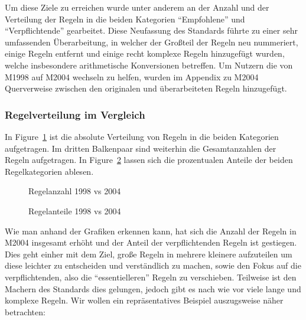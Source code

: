 \documentclass[a4paper,UKenglish,cleveref, autoref]{templates/lipics-v2019}
\begin{document}
    Um diese Ziele zu erreichen wurde unter anderem an der Anzahl und der Verteilung der Regeln in die beiden Kategorien
    \enquote{Empfohlene} und \enquote{Verpflichtende} gearbeitet.
    Diese Neufassung des Standards führte zu einer sehr umfassenden Überarbeitung, in welcher der Großteil der Regeln
    neu nummeriert, einige Regeln entfernt und einige recht komplexe Regeln hinzugefügt wurden, welche insbesondere
    arithmetische Konversionen betreffen.
    Um Nutzern die von M1998 auf M2004 wechseln zu helfen, wurden im Appendix zu M2004 Querverweise zwischen den originalen
    und überarbeiteten Regeln hinzugefügt.

    \subsubsection{Regelverteilung im Vergleich}

    In Figure~\ref{fig:bar-1998-2004} ist die absolute Verteilung von Regeln in die beiden Kategorien aufgetragen.
    Im dritten Balkenpaar sind weiterhin die Gesamtanzahlen der Regeln aufgetragen.
    In Figure~\ref{fig:pie-1998-2004} lassen sich die prozentualen Anteile der beiden Regelkategorien ablesen.

    \begin{figure}[H]
        \centering
        \captionsetup{justification=centering,margin=2cm}
        
        \caption{Regelanzahl 1998 vs 2004}
        \label{fig:bar-1998-2004}
    \end{figure}

    \begin{figure}[H]
        \centering
        \captionsetup{justification=centering,margin=2cm}
        
        \caption{Regelanteile 1998 vs 2004}
        \label{fig:pie-1998-2004}
    \end{figure}

    Wie man anhand der Grafiken erkennen kann, hat sich die Anzahl der Regeln in M2004 insgesamt erhöht und der Anteil
    der verpflichtenden Regeln ist gestiegen.
    Dies geht einher mit dem Ziel, große Regeln in mehrere kleinere aufzuteilen um diese leichter zu entscheiden
    und verständlich zu machen, sowie den Fokus auf die verpflichtenden, also die \enquote{essentielleren} Regeln zu verschieben.
    Teilweise ist den Machern des Standards dies gelungen, jedoch gibt es nach wie vor viele lange und komplexe Regeln.
    Wir wollen ein repräsentatives Beispiel auszugsweise näher betrachten:
\end{document}
